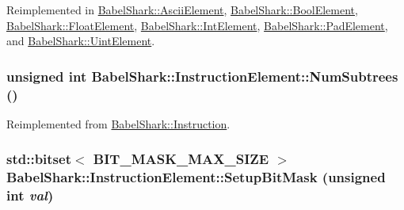 Reimplemented in \hyperlink{class_babel_shark_1_1_ascii_element_452958c460980a70b80d02b659c11057}{BabelShark::AsciiElement}, \hyperlink{class_babel_shark_1_1_bool_element_5eac4fa70d0dcf64414000285324d476}{BabelShark::BoolElement}, \hyperlink{class_babel_shark_1_1_float_element_8431ada746a028580cccdadc83538793}{BabelShark::FloatElement}, \hyperlink{class_babel_shark_1_1_int_element_d8467ad7b321f4189f944833ee60990f}{BabelShark::IntElement}, \hyperlink{class_babel_shark_1_1_pad_element_06d4d9d5aca06773f994b794114bb093}{BabelShark::PadElement}, and \hyperlink{class_babel_shark_1_1_uint_element_61c83ce006915d71961667032f77b6db}{BabelShark::UintElement}.\hypertarget{class_babel_shark_1_1_instruction_element_a99dae4733a6937c0d7f0232526b8db5}{
\subsubsection[{NumSubtrees}]{\setlength{\rightskip}{0pt plus 5cm}unsigned int BabelShark::InstructionElement::NumSubtrees ()}}
\label{class_babel_shark_1_1_instruction_element_a99dae4733a6937c0d7f0232526b8db5}




Reimplemented from \hyperlink{class_babel_shark_1_1_instruction_da0c4af8c73c7aae8b8d3a32a09f11e4}{BabelShark::Instruction}.\hypertarget{class_babel_shark_1_1_instruction_element_c1c5ebe0551be16e29ea91fd46b39339}{
\subsubsection[{SetupBitMask}]{\setlength{\rightskip}{0pt plus 5cm}std::bitset$<$ BIT\_\-MASK\_\-MAX\_\-SIZE $>$ BabelShark::InstructionElement::SetupBitMask (unsigned int {\em val})}}
\label{class_babel_shark_1_1_instruction_element_c1c5ebe0551be16e29ea91fd46b39339}





